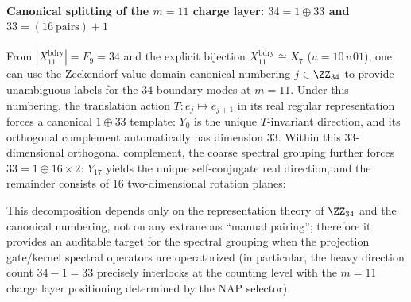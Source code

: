 \paragraph{Canonical splitting of the \texorpdfstring{$m=11$}{m=11} charge layer: \texorpdfstring{$34=1\oplus 33$}{34=1+33} and \texorpdfstring{$33=(16\ \text{pairs})+1$}{33=(16 pairs)+1}}
From \(|X_{11}^{\mathrm{bdry}}|=F_9=34\) and the explicit bijection \(X_{11}^{\mathrm{bdry}}\cong X_7\) (\(u=10\,v\,01\)),
one can use the Zeckendorf value domain canonical numbering \(j\in\ZZ_{34}\) to provide unambiguous labels for the \(34\) boundary modes at \(m=11\).
Under this numbering, the translation action \(T:e_j\mapsto e_{j+1}\) in its real regular representation forces a canonical \(1\oplus 33\) template: \(Y_0\) is the unique \(T\)-invariant direction, and its orthogonal complement automatically has dimension \(33\).
Within this \(33\)-dimensional orthogonal complement, the coarse spectral grouping further forces \(33=1\oplus 16\times 2\): \(Y_{17}\) yields the unique self-conjugate real direction, and the remainder consists of \(16\) two-dimensional rotation planes:

This decomposition depends only on the representation theory of \(\ZZ_{34}\) and the canonical numbering, not on any extraneous ``manual pairing'';
therefore it provides an auditable target for the spectral grouping when the projection gate/kernel spectral operators are operatorized (in particular, the heavy direction count \(34-1=33\) precisely interlocks at the counting level with the \(m=11\) charge layer positioning determined by the NAP selector).
